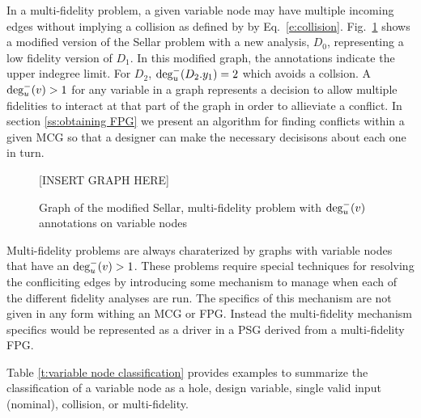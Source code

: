   In a multi-fidelity problem, a given variable node may have multiple incoming 
  edges without implying a collision as defined by by Eq.~\ref{e:collision}. 
  Fig.~\ref{f:collision_example} shows a modified version of the Sellar problem 
  with a new analysis, $D_0$, representing a low fidelity version of $D_1$. 
  In this modified graph, the annotations indicate the upper indegree limit. For 
  $D_2$, $\textrm{deg}^-_u(D_2.y_1) = 2$ which avoids a collsion. A  
  $\textrm{deg}^-_u(v) > 1$ for any variable in a graph represents a decision to 
  allow multiple fidelities to interact at that part of the graph in order to allieviate
  a conflict. In section \ref{ss:obtaining FPG} we present an algorithm for finding 
  conflicts within a given MCG so that a designer can make the necessary decisisons about each 
  one in turn. 
  \begin{figure}
    \begin{center}
    [INSERT GRAPH HERE]
    \caption{Graph of the modified Sellar, multi-fidelity problem with $\textrm{deg}^-_u(v)$ annotations on variable nodes\label{f:collision_example}}
  \end{center}
  \end{figure}

  Multi-fidelity problems are always charaterized by graphs with variable 
  nodes that have an $\textrm{deg}^-_u(v) > 1$. These problems require 
  special techniques for resolving the confliciting edges by introducing some mechanism
  to manage when each of the different fidelity analyses are 
  run\cite{march2012provably,alexandrov2001approximation,Huang_Allen_Notz_Miller_2006}.
  The specifics of this mechanism are not given in any form withing an MCG or 
  FPG. Instead the multi-fidelity mechanism specifics would be represented as a 
  driver in a PSG derived from a multi-fidelity FPG. 

Table \ref{t:variable node classification} provides examples to summarize the classification of a variable node as a hole, design variable, single valid input (nominal), collision, or multi-fidelity.

